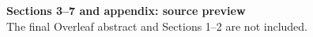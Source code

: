 

\maketitle
\begin{center}\textbf{Sections 3--7 and appendix: source preview}\\
The final Overleaf abstract and Sections 1--2 are not included.\end{center}
\setcounter{section}{2}




\PrintSSCAppendix

